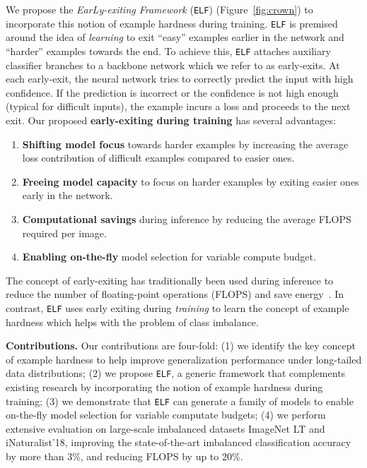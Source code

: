 \documentclass{article}
\newcommand{\method}{\texttt{ELF}\xspace}
\begin{document}
We propose the \textit{EarLy-exiting Framework} (\method{}) (Figure~\ref{fig:crown}) to incorporate this notion of example hardness during training.
\method{} is premised around the idea of \textit{learning} to exit ``easy'' examples earlier in the network and ``harder'' examples towards the end.
To achieve this, \method attaches auxiliary classifier branches to a backbone network which we refer to as early-exits.
At each early-exit, the neural network tries to correctly predict the input with high confidence. 
If the prediction is incorrect or the confidence is not high enough (typical for difficult inputs), the example incurs a loss and proceeds to the next exit. 
Our proposed \textbf{early-exiting during training} has several advantages:


\begin{enumerate}[leftmargin=*]
    \item \textbf{Shifting model focus} towards harder examples by increasing the average loss contribution of difficult examples compared to easier ones.
    
    \item \textbf{Freeing model capacity} to focus on harder examples by exiting easier ones early in the network.
    
    \item \textbf{Computational savings} during inference by reducing the average FLOPS required per image.
    
    \item \textbf{Enabling on-the-fly} model selection for variable compute budget.
\end{enumerate}

The concept of early-exiting has traditionally been used during inference to reduce the number of floating-point operations (FLOPS) and save energy~\cite{teerapittayanon2016branchynet,huang2017multi}.
In contrast, \method{} uses early exiting during \textit{training} to learn the concept of example hardness which helps with the problem of class imbalance.

\noindent
\textbf{Contributions.} Our contributions are four-fold:
(1) we identify the key concept of example hardness to help improve generalization performance under long-tailed data distributions;
(2) we propose \method{}, a generic framework that complements existing research by incorporating the notion of example hardness during training;
(3) we demonstrate that \method{} can generate a family of models to enable on-the-fly model selection for variable computate budgets;
(4) we perform extensive evaluation on large-scale imbalanced datasets ImageNet LT and iNaturalist'18, improving the state-of-the-art imbalanced classification accuracy by more than 3\%, and reducing FLOPS by up to 20\%.
\end{document}
